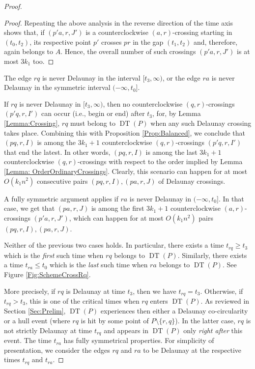 \documentclass[letter,11pt]{article}
\def\DT{\mathop{\mathrm{DT}}}
\begin{document}
\begin{proof}
\begin{proof}
Repeating the above analysis in the reverse direction of the time axis shows that, if $(p'a,r,J')$ is a counterclockwise $(a,r)$-crossing starting in $(t_0,t_2)$, its respective point $p'$ crosses $pr$ in the gap $(t_1,t_2)$ and, therefore, again belongs to $A$.
Hence, the overall number of such crossings $(p'a,r,J')$ is at most $3k_1$ too.
\end{proof}













\smallskip
{} The edge $rq$ is never Delaunay in the interval $[t_3,\infty)$, or the edge $ra$ is never Delaunay in the symmetric interval $(-\infty,t_0]$.

If $rq$ is never Delaunay in $[t_3,\infty)$, then no counterclockwise $(q,r)$-crossings $(p'q,r,I')$ can occur (i.e., begin or end) after $t_3$, for, by Lemma \ref{Lemma:Crossing}, $rq$ must belong to $\DT(P)$ when any such Delaunay crossing takes place. 
Combining this with Proposition \ref{Prop:Balanced}, we conclude that $(pq,r,I)$ is among the $3k_1+1$ counterclockwise $(q,r)$-crossings $(p'q,r,I')$ that end the latest. In other words, $(pq,r,I)$ is among the last $3k_1+1$ counterclockwise $(q,r)$-crossings with respect to the order implied by Lemma \ref{Lemma: OrderOrdinaryCrossings}. Clearly, this scenario can happen for at most $O(k_1n^2)$ consecutive pairs $(pq,r,I), (pa,r,J)$ of Delaunay crossings. 

A fully symmetric argument applies if $ra$ is never Delaunay in $(-\infty,t_0]$.
In that case, we get that $(pa,r,J)$ is among the first $3k_1+1$ counterclockwise $(a,r)$-crossings $(p'a,r,J')$, which can happen for at most $O(k_1n^2)$ pairs $(pq,r,I),(pa,r,J)$.

\medskip
{} Neither of the previous two cases holds. 
In particular, there exists a time $t_{rq}\geq t_3$ which is the {\it first} such time when $rq$ belongs to $\DT(P)$.
Similarly, there exists a time $t_{ra}\leq t_0$ which is the {\it last} such time when $ra$ belongs to $\DT(P)$. See Figure \ref{Fig:SchemeCrossRq}.

More precisely, if $rq$ is Delaunay at time $t_3$, then we have $t_{rq}=t_3$. Otherwise, if $t_{rq}>t_3$, this is one of the critical times when $rq$ enters $\DT(P)$. As reviewed in Section \ref{Sec:Prelim}, $\DT(P)$ experiences then either a Delaunay co-circularity or a hull event (where $rq$ is hit by some point of $P\setminus \{r,q\}$). In the latter case, $rq$ is not strictly Delaunay at time $t_{rq}$ and appears in $\DT(P)$ only {\it right after} this event. The time $t_{ra}$ has fully symmetrical properties. For simplicity of presentation, we consider the edges $rq$ and $ra$ to be Delaunay at the respective times $t_{rq}$ and $t_{ra}$.


\end{proof}
\end{document}
